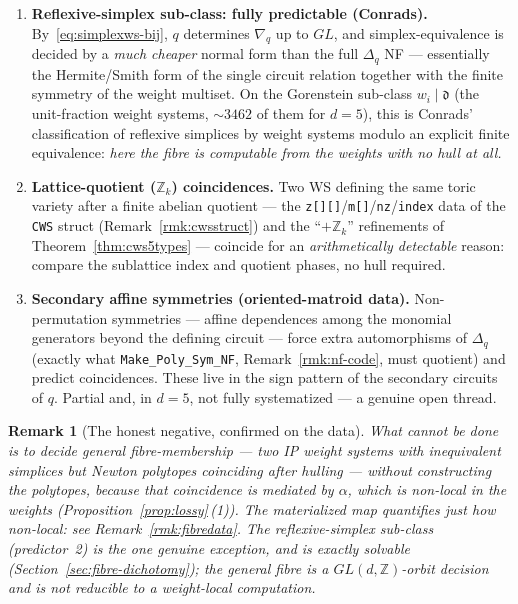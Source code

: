 \documentclass{amsart}
\newtheorem{remark}[theorem]{Remark}
\begin{document}
\begin{enumerate}
  \item \textbf{Reflexive-simplex sub-class: fully predictable (Conrads).}
        By~\eqref{eq:simplexws-bij}, $q$ determines $\nabla_q$ up to $GL$, and
        simplex-equivalence is decided by a \emph{much cheaper} normal form than
        the full $\Delta_q$ NF --- essentially the Hermite/Smith form of the
        single circuit relation together with the finite symmetry of the weight
        multiset. On the Gorenstein sub-class $w_i\mid\mathfrak d$ (the
        unit-fraction weight systems, $\sim$$3462$ of them for $d=5$), this is
        Conrads' classification of reflexive simplices by weight systems modulo
        an explicit finite equivalence: \emph{here the fibre is computable from
        the weights with no hull at all.}
  \item \textbf{Lattice-quotient ($\mathbb Z_k$) coincidences.} Two WS defining
        the same toric variety after a finite abelian quotient --- the
        \texttt{z[][]}/\texttt{m[]}/\texttt{nz}/\texttt{index} data of the
        \texttt{CWS} struct (Remark~\ref{rmk:cwsstruct}) and the
        ``$+\mathbb Z_k$'' refinements of Theorem~\ref{thm:cws5types} ---
        coincide for an \emph{arithmetically detectable} reason: compare the
        sublattice index and quotient phases, no hull required.
  \item \textbf{Secondary affine symmetries (oriented-matroid data).}
        Non-permutation symmetries --- affine dependences among the monomial
        generators beyond the defining circuit --- force extra automorphisms of
        $\Delta_q$ (exactly what \texttt{Make\_Poly\_Sym\_NF},
        Remark~\ref{rmk:nf-code}, must quotient) and predict coincidences. These
        live in the sign pattern of the secondary circuits of $q$. Partial and,
        in $d=5$, not fully systematized --- a genuine open thread.
\end{enumerate}

\begin{remark}[The honest negative, confirmed on the data]\label{rmk:fibrenegative}
What \emph{cannot} be done is to decide \emph{general} fibre-membership --- two
IP weight systems with inequivalent simplices but Newton polytopes coinciding
after hulling --- without constructing the polytopes, because that coincidence
is mediated by $\alpha$, which is non-local in the weights
(Proposition~\ref{prop:lossy}\,(1)). The materialized map quantifies just how
non-local: see Remark~\ref{rmk:fibredata}. The reflexive-simplex sub-class
(predictor~2) is the one genuine exception, and is exactly solvable
(Section~\ref{sec:fibre-dichotomy}); the general fibre is a
$GL(d,\mathbb Z)$-orbit decision and is not reducible to a weight-local
computation.
\end{remark}
\end{document}
